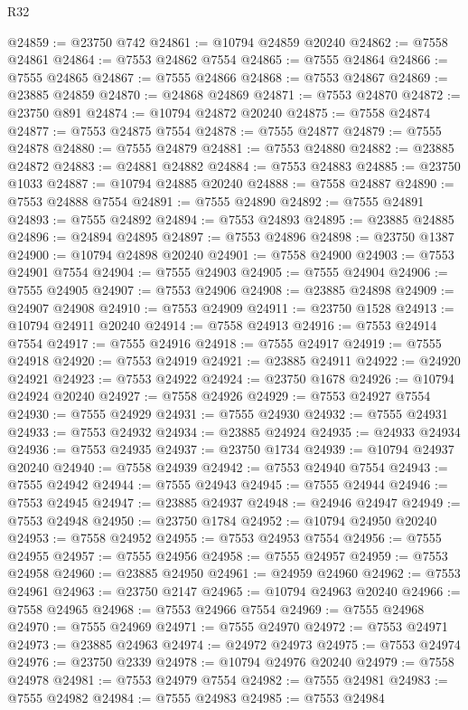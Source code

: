 \begin{lexlean}{R32}
\begin{coremodule}
@24859 := @23750 @742
@24861 := @10794 @24859 @20240
@24862 := @7558 @24861
@24864 := @7553 @24862 @7554
@24865 := @7555 @24864
@24866 := @7555 @24865
@24867 := @7555 @24866
@24868 := @7553 @24867
@24869 := @23885 @24859
@24870 := @24868 @24869
@24871 := @7553 @24870
@24872 := @23750 @891
@24874 := @10794 @24872 @20240
@24875 := @7558 @24874
@24877 := @7553 @24875 @7554
@24878 := @7555 @24877
@24879 := @7555 @24878
@24880 := @7555 @24879
@24881 := @7553 @24880
@24882 := @23885 @24872
@24883 := @24881 @24882
@24884 := @7553 @24883
@24885 := @23750 @1033
@24887 := @10794 @24885 @20240
@24888 := @7558 @24887
@24890 := @7553 @24888 @7554
@24891 := @7555 @24890
@24892 := @7555 @24891
@24893 := @7555 @24892
@24894 := @7553 @24893
@24895 := @23885 @24885
@24896 := @24894 @24895
@24897 := @7553 @24896
@24898 := @23750 @1387
@24900 := @10794 @24898 @20240
@24901 := @7558 @24900
@24903 := @7553 @24901 @7554
@24904 := @7555 @24903
@24905 := @7555 @24904
@24906 := @7555 @24905
@24907 := @7553 @24906
@24908 := @23885 @24898
@24909 := @24907 @24908
@24910 := @7553 @24909
@24911 := @23750 @1528
@24913 := @10794 @24911 @20240
@24914 := @7558 @24913
@24916 := @7553 @24914 @7554
@24917 := @7555 @24916
@24918 := @7555 @24917
@24919 := @7555 @24918
@24920 := @7553 @24919
@24921 := @23885 @24911
@24922 := @24920 @24921
@24923 := @7553 @24922
@24924 := @23750 @1678
@24926 := @10794 @24924 @20240
@24927 := @7558 @24926
@24929 := @7553 @24927 @7554
@24930 := @7555 @24929
@24931 := @7555 @24930
@24932 := @7555 @24931
@24933 := @7553 @24932
@24934 := @23885 @24924
@24935 := @24933 @24934
@24936 := @7553 @24935
@24937 := @23750 @1734
@24939 := @10794 @24937 @20240
@24940 := @7558 @24939
@24942 := @7553 @24940 @7554
@24943 := @7555 @24942
@24944 := @7555 @24943
@24945 := @7555 @24944
@24946 := @7553 @24945
@24947 := @23885 @24937
@24948 := @24946 @24947
@24949 := @7553 @24948
@24950 := @23750 @1784
@24952 := @10794 @24950 @20240
@24953 := @7558 @24952
@24955 := @7553 @24953 @7554
@24956 := @7555 @24955
@24957 := @7555 @24956
@24958 := @7555 @24957
@24959 := @7553 @24958
@24960 := @23885 @24950
@24961 := @24959 @24960
@24962 := @7553 @24961
@24963 := @23750 @2147
@24965 := @10794 @24963 @20240
@24966 := @7558 @24965
@24968 := @7553 @24966 @7554
@24969 := @7555 @24968
@24970 := @7555 @24969
@24971 := @7555 @24970
@24972 := @7553 @24971
@24973 := @23885 @24963
@24974 := @24972 @24973
@24975 := @7553 @24974
@24976 := @23750 @2339
@24978 := @10794 @24976 @20240
@24979 := @7558 @24978
@24981 := @7553 @24979 @7554
@24982 := @7555 @24981
@24983 := @7555 @24982
@24984 := @7555 @24983
@24985 := @7553 @24984

\end{coremodule}
\end{lexlean}
